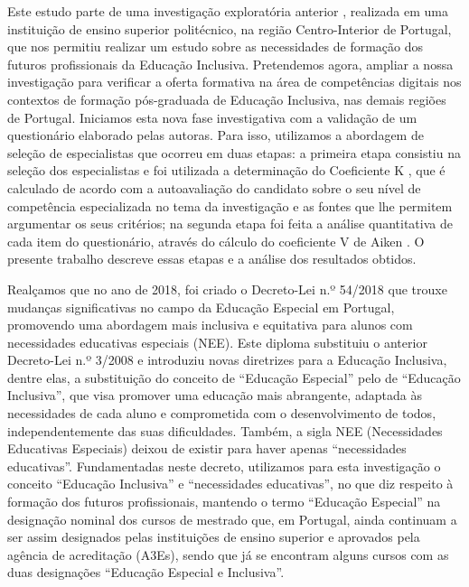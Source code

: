 \documentclass[portuguese]{textolivre}
\begin{document}
Este estudo parte de uma investigação exploratória anterior \cite{loureiro_pensamiento_2022}, realizada em uma instituição de ensino superior politécnico, na região Centro-Interior de Portugal, que nos permitiu realizar um estudo sobre as necessidades de formação dos futuros profissionais da Educação Inclusiva. Pretendemos agora, ampliar a nossa investigação para verificar a oferta formativa na área de competências digitais nos contextos de formação pós-graduada de Educação Inclusiva, nas demais regiões de Portugal. Iniciamos esta nova fase investigativa com a validação de um questionário elaborado pelas autoras. Para isso, utilizamos a abordagem de seleção de especialistas que ocorreu em duas etapas: a primeira etapa consistiu na seleção dos especialistas e foi utilizada a determinação do Coeficiente K \cite{cabero_almenara_utilizacion_2013,garcia_procedimiento_2008,lopez_gutierrez_establecimiento_2011,luis_desenvolvimento_2023}, que é calculado de acordo com a autoavaliação do candidato sobre o seu nível de competência especializada no tema da investigação e as fontes que lhe permitem argumentar os seus critérios; na segunda etapa foi feita a análise quantitativa de cada item do questionário, através do cálculo do coeficiente V de Aiken \cite{aiken_content_1980}. O presente trabalho descreve essas etapas e a análise dos resultados obtidos.

Realçamos que no ano de 2018, foi criado o Decreto-Lei n.º 54/2018 \cite{portugal_decreto-lei_2018} que trouxe mudanças significativas no campo da Educação Especial em Portugal, promovendo uma abordagem mais inclusiva e equitativa para alunos com necessidades educativas especiais (NEE). Este diploma substituiu o anterior Decreto-Lei n.º 3/2008 e introduziu novas diretrizes para a Educação Inclusiva, dentre elas, a substituição do conceito de “Educação Especial” pelo de “Educação Inclusiva”, que visa promover uma educação mais abrangente, adaptada às necessidades de cada aluno e comprometida com o desenvolvimento de todos, independentemente das suas dificuldades. Também, a sigla NEE (Necessidades Educativas Especiais) deixou de existir para haver apenas “necessidades educativas”. Fundamentadas neste decreto, utilizamos para esta investigação o conceito “Educação Inclusiva” e “necessidades educativas”, no que diz respeito à formação dos futuros profissionais, mantendo o termo “Educação Especial” na designação nominal dos cursos de mestrado que, em Portugal, ainda continuam a ser assim designados pelas instituições de ensino superior e aprovados pela agência de acreditação (A3Es), sendo que já se encontram alguns cursos com as duas designações “Educação Especial e Inclusiva”.
\end{document}
